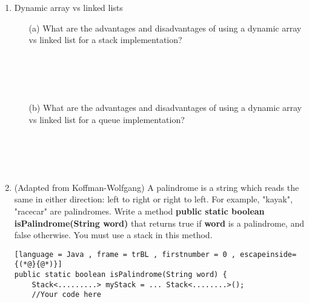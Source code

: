 \documentclass[letter]{article}
\begin{document}
\begin{enumerate}[1.]
\begin{itemize}
\begin{lstlisting}[language = Java , frame = trBL , firstnumber = 0 , escapeinside={(*@}{@*)}]
while (!myStack.isEmpty()) { //isEmpty returns true if stack is empty
    System.out.println(names.pop());
}
System.out.println(sound);
    \end{lstlisting}
    \item [(c)] (Adapted from Koffman-Wolfgang) What is the output of the following:

    \begin{lstlisting}[language = Java , frame = trBL , firstnumber = 0 , escapeinside={(*@}{@*)}]
Queue<String> myQueue = new Queue<String>();
myQueue.enqueue("meow");
myQueue.enqueue("woof");
myQueue.enqueue("moo");
myQueue.enqueue("oink");
String sound = myStack.peek();

while (!myStack.isEmpty()) { //isEmpty returns true if stack is empty
    System.out.println(names.dequeue());
}
System.out.println(sound);
    \end{lstlisting}
    \end{itemize}
    
    \item Dynamic array vs linked lists
    \begin{itemize}
        \item [(a)] What are the advantages and disadvantages of using a dynamic array vs linked list for a stack implementation?\\\\\\\\\\
        \item [(b)] What are the advantages and disadvantages of using a dynamic array vs linked list for a queue implementation?\\\\\\\\\\
    \end{itemize}

    \newpage
    \item (Adapted from Koffman-Wolfgang) A palindrome is a string which reads the same in either direction: left to right or right to left. For example, "kayak", "racecar" are palindromes. Write a method \textbf{public static boolean isPalindrome(String word)} that returns true if \textbf{word} is a palindrome, and false otherwise. You must use a stack in this method. 

    \begin{lstlisting}[language = Java , frame = trBL , firstnumber = 0 , escapeinside={(*@}{@*)}]
public static boolean isPalindrome(String word) {
    Stack<.........> myStack = ... Stack<........>();
    //Your code here

















\end{lstlisting}
\end{enumerate}
\end{document}
